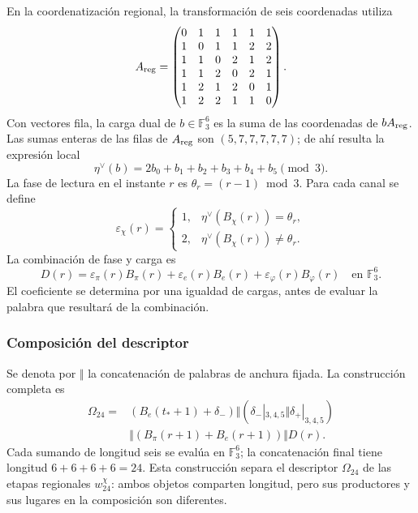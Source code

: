 En la coordenatización regional, la transformación de seis coordenadas utiliza
\[
 A_{\rm reg}=
 \begin{pmatrix}
 0&1&1&1&1&1\\
 1&0&1&1&2&2\\
 1&1&0&2&1&2\\
 1&1&2&0&2&1\\
 1&2&1&2&0&1\\
 1&2&2&1&1&0
 \end{pmatrix}.
\]
Con vectores fila, la carga dual de $b\in\mathbb F_3^6$ es la suma
de las coordenadas de $bA_{\rm reg}$. Las sumas enteras de las filas de
$A_{\rm reg}$ son $(5,7,7,7,7,7)$; de ahí resulta la expresión local
\begin{equation}
 \eta^\vee(b)=2b_0+b_1+b_2+b_3+b_4+b_5\pmod3.
 \label{act21:eq:kdes-cargadual}
\end{equation}
La fase de lectura en el instante $r$ es
$\theta_r=(r-1)\bmod3$. Para cada canal se define
\[
 \varepsilon_\chi(r)=
 \begin{cases}
 1,&\eta^\vee(B_\chi(r))=\theta_r,\\
 2,&\eta^\vee(B_\chi(r))\ne\theta_r.
 \end{cases}
\]
La combinación de fase y carga es
\begin{equation}
 D(r)=\varepsilon_\pi(r)B_\pi(r)
      +\varepsilon_e(r)B_e(r)
      +\varepsilon_\varphi(r)B_\varphi(r)
      \quad\text{en }\mathbb F_3^6.
 \label{act21:eq:kdes-fasecarga}
\end{equation}
El coeficiente se determina por una igualdad de cargas, antes de evaluar
la palabra que resultará de la combinación.

\subsubsection{Composición del descriptor}

Se denota por $\Vert$ la concatenación de palabras de anchura fijada.
La construcción completa es
\begin{equation}
 \begin{split}
 \Omega_{24}={}&
 (B_e(t_*+1)+\delta_-)
 \Vert (\delta_-|_{3,4,5}\Vert\delta_+|_{3,4,5})\\
 &\Vert(B_\pi(r+1)+B_e(r+1))\Vert D(r).
 \end{split}
 \label{act21:eq:kdes-omega}
\end{equation}
Cada sumando de longitud seis se evalúa en $\mathbb F_3^6$; la
concatenación final tiene longitud $6+6+6+6=24$. Esta construcción
separa el descriptor $\Omega_{24}$ de las etapas regionales
$w_{24}^{\chi}$: ambos objetos comparten longitud, pero sus productores
y sus lugares en la composición son diferentes.

